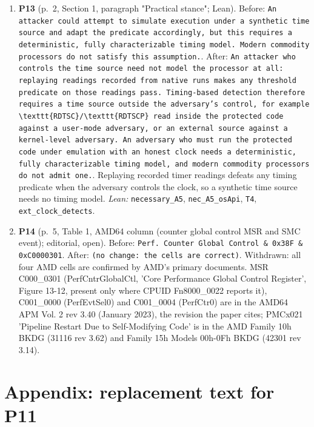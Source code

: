 \documentclass[9pt,twocolumn]{article}
\begin{document}
\begin{enumerate}[label=]
\item \textbf{P13} (p.~2, Section 1, paragraph "Practical stance"; Lean). Before: \texttt{An attacker could attempt to simulate execution under a synthetic time source and adapt the predicate accordingly, but this requires a deterministic, fully characterizable timing model.  Modern commodity processors do not satisfy this assumption.}. After: \texttt{An attacker who controls the time source need not model the processor at all: replaying readings recorded from native runs makes any threshold predicate on those readings pass.  Timing-based detection therefore requires a time source outside the adversary's control, for example \textbackslash{}texttt\{RDTSC\}/\textbackslash{}texttt\{RDTSCP\} read inside the protected code against a user-mode adversary, or an external source against a kernel-level adversary.  An adversary who must run the protected code under emulation with an honest clock needs a deterministic, fully characterizable timing model, and modern commodity processors do not admit one.}. Replaying recorded timer readings defeats any timing predicate when the adversary controls the clock, so a synthetic time source needs no timing model. \emph{Lean:} \texttt{necessary\_A5}, \texttt{nec\_A5\_osApi}, \texttt{T4}, \texttt{ext\_clock\_detects}. 
\item \textbf{P14} (p.~5, Table 1, AMD64 column (counter global control MSR and SMC event); editorial, open). Before: \texttt{Perf. Counter Global Control \& 0x38F \& 0xC0000301}. After: \texttt{(no change: the cells are correct)}. Withdrawn: all four AMD cells are confirmed by AMD's primary documents. MSR C000\_0301 (PerfCntrGlobalCtl, 'Core Performance Global Control Register', Figure 13-12, present only where CPUID Fn8000\_0022 reports it), C001\_0000 (PerfEvtSel0) and C001\_0004 (PerfCtr0) are in the AMD64 APM Vol. 2 rev 3.40 (January 2023), the revision the paper cites; PMCx021 'Pipeline Restart Due to Self-Modifying Code' is in the AMD Family 10h BKDG (31116 rev 3.62) and Family 15h Models 00h-0Fh BKDG (42301 rev 3.14). 
\end{enumerate}
\onecolumn\section*{Appendix: replacement text for P11}
\end{document}
